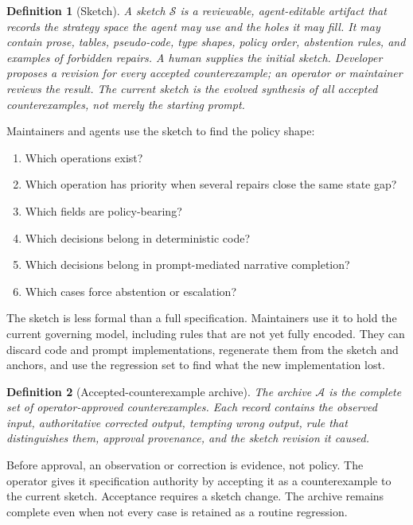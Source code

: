 \documentclass[11pt]{article}
\newtheorem{definition}{Definition}
\newcommand{\sketch}{\mathcal{S}}
\newcommand{\archive}{\mathcal{A}}
\begin{document}
\begin{definition}[Sketch]
A sketch $\sketch$ is a reviewable, agent-editable artifact that records the strategy space the
agent may use and the holes it may fill.  It may contain prose, tables, pseudo-code, type shapes,
policy order, abstention rules, and examples of forbidden repairs.  A human supplies the initial
sketch.  Developer proposes a revision for every accepted counterexample; an operator or
maintainer reviews the result.  The current sketch is the evolved synthesis of all accepted
counterexamples, not merely the starting prompt.
\end{definition}

Maintainers and agents use the sketch to find the policy shape:

\begin{enumerate}
  \item Which operations exist?
  \item Which operation has priority when several repairs close the same state gap?
  \item Which fields are policy-bearing?
  \item Which decisions belong in deterministic code?
  \item Which decisions belong in prompt-mediated narrative completion?
  \item Which cases force abstention or escalation?
\end{enumerate}

The sketch is less formal than a full specification.  Maintainers use it to hold the current
governing model, including rules that are not yet fully encoded.  They can discard code and
prompt implementations, regenerate them from the sketch and anchors, and use the regression set
to find what the new implementation lost.

\begin{definition}[Accepted-counterexample archive]
The archive $\archive$ is the complete set of operator-approved counterexamples.  Each record
contains the observed input, authoritative corrected output, tempting wrong output, rule that
distinguishes them, approval provenance, and the sketch revision it caused.
\end{definition}

Before approval, an observation or correction is evidence, not policy.  The operator gives it
specification authority by accepting it as a counterexample to the current sketch.  Acceptance
requires a sketch change.  The archive remains complete even when not every case is retained as
a routine regression.
\end{document}
